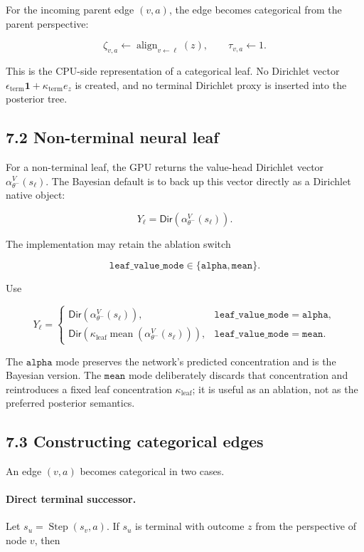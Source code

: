 \documentclass[11pt]{article}
\newcommand{\mean}{\operatorname{mean}}
\newcommand{\Step}{\operatorname{Step}}
\newcommand{\Align}{\operatorname{align}}
\newcommand{\DirObj}{\mathsf{Dir}}
\begin{document}
For the incoming parent edge \((v,a)\), the edge becomes categorical from the
parent perspective:

\[
\zeta_{v,a}\gets\Align_{v\leftarrow \ell}(z),
\qquad
\tau_{v,a}\gets 1.
\]

This is the CPU-side representation of a categorical leaf. No Dirichlet vector
\(\epsilon_{\mathrm{term}}\mathbf{1}+\kappa_{\mathrm{term}}e_z\) is created, and
no terminal Dirichlet proxy is inserted into the posterior tree.

\subsection*{7.2 Non-terminal neural leaf}

For a non-terminal leaf, the GPU returns the value-head Dirichlet vector
\(\alpha_{\theta^-}^V(s_\ell)\). The Bayesian default is to back up this vector
directly as a Dirichlet native object:

\[
Y_\ell
=
\DirObj(\alpha_{\theta^-}^V(s_\ell)).
\]

The implementation may retain the ablation switch

\[
\texttt{leaf\_value\_mode}
\in
\{\texttt{alpha},\texttt{mean}\}.
\]

Use

\[
Y_\ell
=
\begin{cases}
\DirObj(\alpha_{\theta^-}^V(s_\ell)),
&\texttt{leaf\_value\_mode}=\texttt{alpha},\\[4pt]
\DirObj\left(\kappa_{\mathrm{leaf}}
\mean\!\left(\alpha_{\theta^-}^V(s_\ell)\right)\right),
&\texttt{leaf\_value\_mode}=\texttt{mean}.
\end{cases}
\]

The \(\texttt{alpha}\) mode preserves the network's predicted concentration and
is the Bayesian version. The \(\texttt{mean}\) mode deliberately discards that
concentration and reintroduces a fixed leaf concentration
\(\kappa_{\mathrm{leaf}}\); it is useful as an ablation, not as the preferred
posterior semantics.

\subsection*{7.3 Constructing categorical edges}

An edge \((v,a)\) becomes categorical in two cases.

\paragraph{Direct terminal successor.}
Let \(s_u=\Step(s_v,a)\). If \(s_u\) is terminal with outcome \(z\) from the
perspective of node \(v\), then
\end{document}
